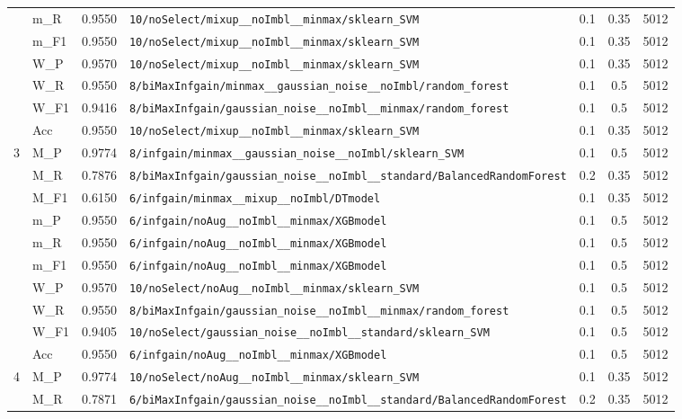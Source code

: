 \begin{table}[htbp]
\begin{tabular}{|c|l|c|>{\ttfamily\footnotesize}p{7.2cm}|c|c|c|}
 & m\_R & 0.9550 & \texttt{10/noSelect/mixup\_\_noImbl\_\_minmax/sklearn\_SVM} & 0.1 & 0.35  & 5012 \\ 
 & m\_F1 & 0.9550 & \texttt{10/noSelect/mixup\_\_noImbl\_\_minmax/sklearn\_SVM} & 0.1 & 0.35  & 5012 \\ 
 & W\_P & 0.9570 & \texttt{10/noSelect/mixup\_\_noImbl\_\_minmax/sklearn\_SVM} & 0.1 & 0.35  & 5012 \\ 
 & W\_R & 0.9550 & \texttt{8/biMaxInfgain/minmax\_\_gaussian\_noise\_\_noImbl/random\_forest} & 0.1 & 0.5  & 5012 \\ 
 & W\_F1 & 0.9416 & \texttt{8/biMaxInfgain/gaussian\_noise\_\_noImbl\_\_minmax/random\_forest} & 0.1 & 0.5  & 5012 \\ 
 & Acc & 0.9550 & \texttt{10/noSelect/mixup\_\_noImbl\_\_minmax/sklearn\_SVM} & 0.1 & 0.35  & 5012 \\ 
\hline
\multirow{10}{*}{3} & M\_P & 0.9774 & \texttt{8/infgain/minmax\_\_gaussian\_noise\_\_noImbl/sklearn\_SVM} & 0.1 & 0.5  & 5012 \\ 
 & M\_R & 0.7876 & \texttt{8/biMaxInfgain/gaussian\_noise\_\_noImbl\_\_standard/BalancedRandomForest} & 0.2 & 0.35  & 5012 \\ 
 & M\_F1 & 0.6150 & \texttt{6/infgain/minmax\_\_mixup\_\_noImbl/DTmodel} & 0.1 & 0.35  & 5012 \\ 
 & m\_P & 0.9550 & \texttt{6/infgain/noAug\_\_noImbl\_\_minmax/XGBmodel} & 0.1 & 0.5  & 5012 \\ 
 & m\_R & 0.9550 & \texttt{6/infgain/noAug\_\_noImbl\_\_minmax/XGBmodel} & 0.1 & 0.5  & 5012 \\ 
 & m\_F1 & 0.9550 & \texttt{6/infgain/noAug\_\_noImbl\_\_minmax/XGBmodel} & 0.1 & 0.5  & 5012 \\ 
 & W\_P & 0.9570 & \texttt{10/noSelect/noAug\_\_noImbl\_\_minmax/sklearn\_SVM} & 0.1 & 0.5  & 5012 \\ 
 & W\_R & 0.9550 & \texttt{8/biMaxInfgain/gaussian\_noise\_\_noImbl\_\_minmax/random\_forest} & 0.1 & 0.5  & 5012 \\ 
 & W\_F1 & 0.9405 & \texttt{10/noSelect/gaussian\_noise\_\_noImbl\_\_standard/sklearn\_SVM} & 0.1 & 0.5  & 5012 \\ 
 & Acc & 0.9550 & \texttt{6/infgain/noAug\_\_noImbl\_\_minmax/XGBmodel} & 0.1 & 0.5  & 5012 \\ 
\hline
\multirow{10}{*}{4} & M\_P & 0.9774 & \texttt{10/noSelect/noAug\_\_noImbl\_\_minmax/sklearn\_SVM} & 0.1 & 0.35  & 5012 \\ 
 & M\_R & 0.7871 & \texttt{6/biMaxInfgain/gaussian\_noise\_\_noImbl\_\_standard/BalancedRandomForest} & 0.2 & 0.35  & 5012 \\ 

\end{tabular}
\end{table}

